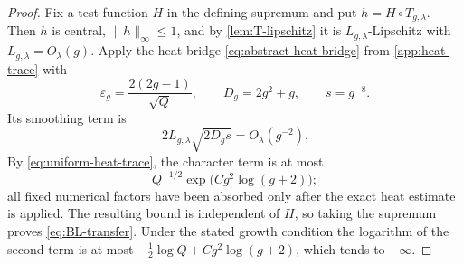 \begin{proof}
Fix a test function \(H\) in the defining supremum and put
\(h=H\circ T_{g,\lambda}\).  Then \(h\) is central,
\(\|h\|_\infty\le1\), and by \cref{lem:T-lipschitz} it is
\(L_{g,\lambda}\)-Lipschitz with \(L_{g,\lambda}=O_\lambda(g)\).
Apply the heat bridge \eqref{eq:abstract-heat-bridge} from
\cref{app:heat-trace} with
\[
 \varepsilon_g=\frac{2(2g-1)}{\sqrt Q},\qquad
 D_g=2g^2+g,\qquad s=g^{-8}.
\]
Its smoothing term is
\[
 2L_{g,\lambda}\sqrt{2D_gs}=O_\lambda(g^{-2}).
\]
By \eqref{eq:uniform-heat-trace}, the character term is at most
\[
 Q^{-1/2}\exp\!\bigl(Cg^2\log(g+2)\bigr);
\]
all fixed numerical factors have been absorbed only after the exact heat
estimate is applied.  The resulting bound is independent of \(H\), so taking
the supremum proves \eqref{eq:BL-transfer}.  Under the stated growth
condition the logarithm of the second term is at most
\(-\tfrac12\log Q+Cg^2\log(g+2)\), which tends to \(-\infty\).
\end{proof}
